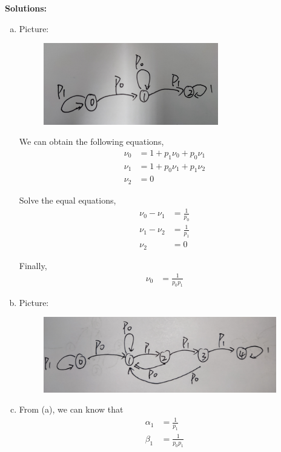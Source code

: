 \documentclass{article}
\begin{document}
    \textbf{Solutions:}
    \begin{enumerate}[(a)]
        \item 
        Picture:
        \begin{figure}[h]
            \centering
            \includegraphics[width=3.0in]{2.jpg}
        \end{figure}

        We can obtain the following equations, 
        \begin{equation*}
            \begin{aligned}
                \nu_0 &= 1+p_1\nu_0+p_0\nu_1\\
                \nu_1 &= 1+p_0\nu_1+p_1\nu_2\\
                \nu_2 &= 0
            \end{aligned}
        \end{equation*}

        Solve the equal equations,
        \begin{equation*}
            \begin{aligned}
                \nu_0 - \nu_1 &= \frac{1}{p_0}\\
                \nu_1 - \nu_2 &= \frac{1}{p_1}\\
                \nu_2 &= 0
            \end{aligned}
        \end{equation*}

        Finally,
        \begin{equation*}
            \begin{aligned}
                \nu_0 &= \frac{1}{p_0p_1}
            \end{aligned}
        \end{equation*}
        \item 
        Picture:
        \begin{figure}[h]
            \centering
            \includegraphics[width=4.0in]{3.jpg}
        \end{figure}
        \item From (a), we can know that
        \begin{equation*}
            \begin{aligned}
                \alpha_1&=\frac{1}{p_1}\\
                \beta_1&=\frac{1}{p_0p_1}
            \end{aligned}
        \end{equation*}


\end{enumerate}
\end{document}
